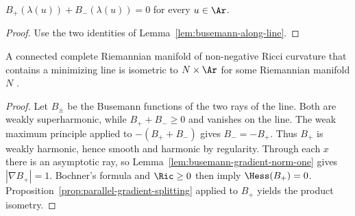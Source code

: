 \begin{corollary}
\label{cor:busemann-pair-vanishes-on-line}
\leanok



$B_+(\lambda(u))+B_-(\lambda(u))=0$ for every $u\in\Ar$.
\end{corollary}
\begin{proof}
\sketch
\leanok
{}
Use the two identities of Lemma~\ref{lem:busemann-along-line}.
\end{proof}

\begin{lemma}
\label{lem:minimizing-line-implies-product}
\label{line}


A connected complete Riemannian manifold of non-negative Ricci
curvature that contains a minimizing line is isometric to
$N\times\Ar$ for some Riemannian manifold $N$
\cite{CheegerGromoll2}.
\end{lemma}
\begin{proof}
\sketch
{}
Let $B_\pm$ be the Busemann functions of the two rays of the line.
Both are weakly superharmonic, while $B_++B_-\ge0$ and vanishes on the
line. The weak maximum principle applied to $-(B_++B_-)$ gives
$B_-=-B_+$. Thus $B_+$ is weakly harmonic, hence smooth and harmonic by
regularity. Through each $x$ there is an asymptotic ray, so
Lemma~\ref{lem:busemann-gradient-norm-one} gives
$|\nabla B_+|=1$. Bochner's formula and $\Ric\ge0$ then imply
$\Hess(B_+)=0$. Proposition~\ref{prop:parallel-gradient-splitting}
applied to $B_+$ yields the product isometry.
\end{proof}

